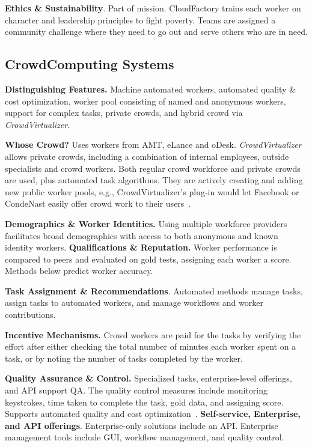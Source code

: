 \documentclass{sigchi}
\begin{document}
{\bf Ethics \& Sustainability}. Part of mission. CloudFactory trains each worker on character and leadership principles to fight poverty. 
Teams are assigned a community challenge where they need to go out and serve others who are in need. 

\subsection{CrowdComputing Systems} 
{\bf Distinguishing Features.} Machine automated workers, automated quality \& cost optimization, worker pool consisting of named and anonymous workers, support for complex tasks, private crowds, and 
hybrid crowd via {\em CrowdVirtualizer}.

{\bf Whose Crowd?} Uses workers from AMT, eLance and oDesk. {\em CrowdVirtualizer} allows private crowds, including a combination of internal employees, outside specialists and crowd workers. Both regular crowd workforce and private crowds are used, plus automated task algorithms. They are actively creating and adding new public worker pools, e.g., 
CrowdVirtualizer's plug-in would let Facebook or CondeNast easily offer crowd work to their users~\cite{ccs-devine13}.

{\bf Demographics \& Worker Identities.} Using multiple workforce providers facilitates broad demographics with access to both anonymous and known identity workers. 
{\bf Qualifications \& Reputation.} Worker performance is compared to peers and evaluated on gold tests, assigning each worker a score. Methods below predict worker accuracy. 

{\bf Task Assignment \& Recommendations}. Automated methods manage tasks, assign tasks to automated workers, and manage workflows and worker contributions. 

{\bf Incentive Mechanisms.}  Crowd workers are paid for the tasks by verifying the effort after either checking the total number of minutes  each worker spent on a task, or by noting the number of tasks completed by the worker.  

{\bf Quality Assurance \& Control.} Specialized tasks, enterprise-level offerings, and API support QA. The quality control measures include monitoring keystrokes, time taken to complete the task, gold data, and assigning score. Supports automated quality and cost optimization~\cite{ccs-devine13}. 
{\bf Self-service, Enterprise, and API offerings}. Enterprise-only solutions include an API. Enterprise management tools include GUI, workflow management, and quality control.
\end{document}
